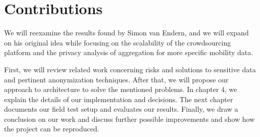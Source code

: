 \section{Contributions}

We will reexamine the results found by Simon van Endern, and we will expand on his original idea while focusing on the scalability of the crowdsourcing platform and the privacy analysis of aggregation for more specific mobility data.

First, we will review related work concerning risks and solutions to sensitive data and pertinent anonymization techniques. After that, we will propose our approach to architecture to solve the mentioned problems. In chapter 4, we explain the details of our implementation and decisions. The next chapter documents our field test setup and evaluates our results. Finally, we draw a conclusion on our work and discuss further possible improvements and show how the project can be reproduced.
